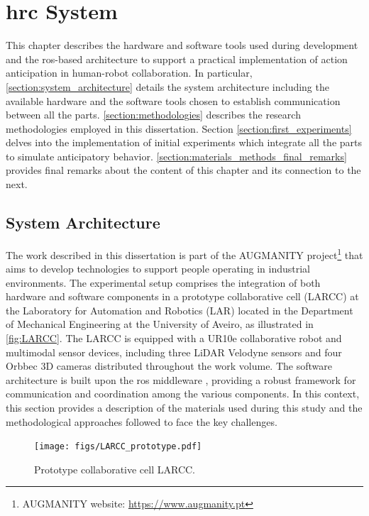 \chapter{\acl{hrc} System}
\label{chapter:hrc_system}

This chapter describes the hardware and software tools used during development and the \acs{ros}-based architecture to support a practical implementation of action anticipation in human-robot collaboration. In particular, \autoref{section:system_architecture} details the system architecture including the available hardware and the software tools chosen to establish communication between all the parts. \autoref{section:methodologies} describes the research methodologies employed in this dissertation. Section \autoref{section:first_experiments} delves into the implementation of initial experiments which integrate all the parts to simulate anticipatory behavior. \autoref{section:materials_methods_final_remarks} provides final remarks about the content of this chapter and its connection to the next.

\section{System Architecture}
\label{section:system_architecture}

The work described in this dissertation is part of the AUGMANITY project\footnote{AUGMANITY website: \url{https://www.augmanity.pt}} that aims to develop technologies to support people operating in industrial environments. The experimental setup comprises the integration of both hardware and software components in a prototype collaborative cell (LARCC) at the Laboratory for Automation and Robotics (LAR) located in the Department of Mechanical Engineering at the University of Aveiro, as illustrated in \autoref{fig:LARCC}. The LARCC is equipped with a UR10e collaborative robot and multimodal sensor devices, including three LiDAR Velodyne sensors and four Orbbec 3D cameras distributed throughout the work volume. The software architecture is built upon the \acf{ros} middleware \cite{Quigley2009}, providing a robust framework for communication and coordination among the various components. In this context, this section provides a description of the materials used during this study and the methodological approaches followed to face the key challenges. 

\begin{figure}[ht]
    \centering
    \texttt{[image: figs/LARCC\_prototype.pdf]}
    \caption{Prototype collaborative cell LARCC.}
    \label{fig:LARCC}
\end{figure}

